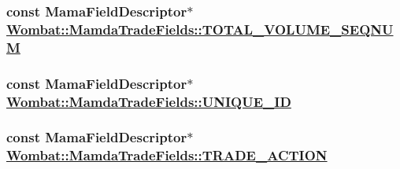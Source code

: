 \hypertarget{classWombat_1_1MamdaTradeFields_7c482bbc03ef706f02812fd8d4583ca5}{
\subsubsection[TOTAL\_\-VOLUME\_\-SEQNUM]{\setlength{\rightskip}{0pt plus 5cm}const Mama\-Field\-Descriptor$\ast$ \hyperlink{classWombat_1_1MamdaTradeFields_7c482bbc03ef706f02812fd8d4583ca5}{Wombat::Mamda\-Trade\-Fields::TOTAL\_\-VOLUME\_\-SEQNUM}}}
\label{classWombat_1_1MamdaTradeFields_7c482bbc03ef706f02812fd8d4583ca5}


\hypertarget{classWombat_1_1MamdaTradeFields_af2ad21c98357d5e12577fdcd1dc40d9}{
\subsubsection[UNIQUE\_\-ID]{\setlength{\rightskip}{0pt plus 5cm}const Mama\-Field\-Descriptor$\ast$ \hyperlink{classWombat_1_1MamdaTradeFields_af2ad21c98357d5e12577fdcd1dc40d9}{Wombat::Mamda\-Trade\-Fields::UNIQUE\_\-ID}}}
\label{classWombat_1_1MamdaTradeFields_af2ad21c98357d5e12577fdcd1dc40d9}


\hypertarget{classWombat_1_1MamdaTradeFields_0bd4ba9dd7d22062dd526c9ab719c3fb}{
\subsubsection[TRADE\_\-ACTION]{\setlength{\rightskip}{0pt plus 5cm}const Mama\-Field\-Descriptor$\ast$ \hyperlink{classWombat_1_1MamdaTradeFields_0bd4ba9dd7d22062dd526c9ab719c3fb}{Wombat::Mamda\-Trade\-Fields::TRADE\_\-ACTION}}}
\label{classWombat_1_1MamdaTradeFields_0bd4ba9dd7d22062dd526c9ab719c3fb}


